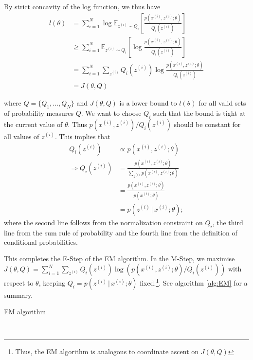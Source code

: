 \documentclass[final,3p,times,twocolumn]{elsarticle}
\DeclareMathOperator*{\argmax}{arg\,max}
\begin{document}
By strict concavity of the log function, we thus have
\begin{equation}
\begin{split}
l(\theta) &=  \sum_{i=1}^N \log \mathbb{E}_{z^{(i)} \sim Q_i}\left[\frac{p(x^{(i)},z^{(i)};\theta)}{Q_i(z^{(i)})}\right]\\
&\geq \sum_{i=1}^N \mathbb{E}_{z^{(i)} \sim Q_i}\left[\log \frac{p(x^{(i)},z^{(i)};\theta)}{Q_i(z^{(i)})}\right]\\ 
&= \sum_{i=1}^N \sum_{z^{(i)}} Q_i(z^{(i)}) \log \frac{p(x^{(i)},z^{(i)};\theta)}{Q_i(z^{(i)})}\\ 
&= J(\theta,Q)
\end{split}
\end{equation}

where $Q=\{Q_1,\dots,Q_N\}$ and $J(\theta,Q)$ is a lower bound to $l(\theta)$ for all valid sets of probability measures $Q$.
We want to choose $Q_i$ such that the bound is tight at the current value of $\theta$.
Thus $p(x^{(i)},z^{(i)})/Q_i(z^{(i)})$ should be constant for all values of $z^{(i)}$. This implies that
\begin{equation}
\begin{split}
Q_i(z^{(i)}) &\propto p(x^{(i)},z^{(i)};\theta)\\
\Rightarrow Q_i(z^{(i)}) &= \frac{p(x^{(i)},z^{(i)};\theta)}{\sum_{z^{(i)}}p(x^{(i)},z^{(i)};\theta)}\\
&= \frac{p(x^{(i)},z^{(i)};\theta)}{p(x^{(i)};\theta)}\\
&= p(z^{(i)}\,|\,x^{(i)};\theta);
\end{split}
\end{equation}
where the second line follows from the normalization constraint on $Q_i$, the third line from the sum rule of probability and the fourth line from the definition of conditional probabilities.

This completes the E-Step of the EM algorithm.
In the M-Step, we maximise $J(\theta,Q) = \sum_{i=1}^N \sum_{z^{(i)}} Q_i(z^{(i)}) \log \left(p(x^{(i)},z^{(i)};\theta)/Q_i(z^{(i)})\right)$ with respect to $\theta$, keeping $Q_i = p(z^{(i)}\,|\,x^{(i)};\theta)$ fixed.\footnote{Thus, the EM algorithm is analogous to coordinate ascent on $J(\theta,Q)$}.
See algorithm \ref{alg:EM} for a summary.

\begin{algorithm}
\caption{EM algorithm}
\label{alg:EM}
\begin{algorithmic}[1]
\Repeat
{}
\EndFor
{}
\State{$\theta = \argmax_\theta \sum_{i=1}^N \sum_{z^{(i)}} Q_i(z^{(i)}) \log \frac{p(x^{(i)},z^{(i)};\theta)}{Q_i(z^{(i)})}$}
\EndProcedure \\
\end{algorithmic}
\end{algorithm}
\end{document}
